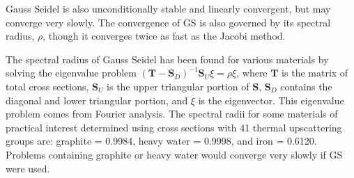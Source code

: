 \documentclass[12pt]{article}
\newcommand{\ve}[1]{\ensuremath{\mathbf{#1}}}
\begin{document}
Gauss Seidel is also unconditionally stable and linearly convergent, but may converge very slowly. The convergence of GS is also governed by its spectral radius, $\rho$, though it converges twice as fast as the Jacobi method.%

The spectral radius of Gauss Seidel has been found for various materials by solving the eigenvalue problem $(\ve{T} - \ve{S}_{D})^{-1}\ve{S}_{U} \xi = \rho \xi$, where $\ve{T}$ is the matrix of total cross sections, $\ve{S}_{U}$ is the upper triangular portion of $\ve{S}$, $\ve{S}_{D}$ contains the diagonal and lower triangular portion, and $\xi$ is the eigenvector. This eigenvalue problem comes from Fourier analysis. The spectral radii for some materials of practical interest determined using cross sections with 41 thermal upscattering groups are: graphite = 0.9984, heavy water = 0.9998, and iron = 0.6120. %
Problems containing graphite or heavy water would converge very slowly if GS were used.   
\end{document}
